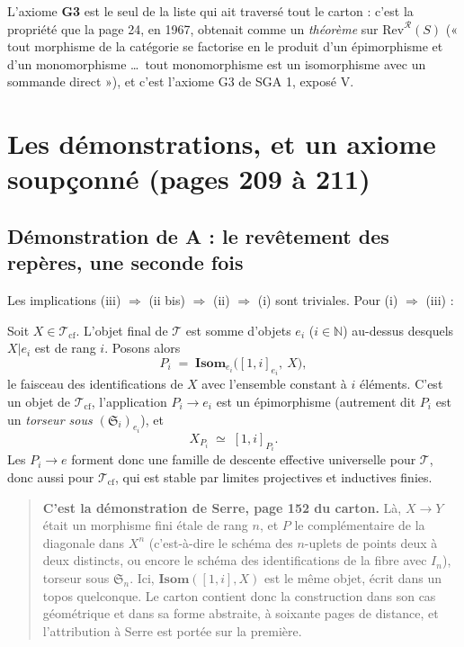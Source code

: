 \documentclass[11pt,a4paper]{article}
\begin{document}
L'axiome \textbf{G3} est le seul de la liste qui ait traversé tout le carton :
c'est la propriété que la page 24, en 1967, obtenait comme un \emph{théorème}
sur $\mathrm{Rev}^{\mathcal{R}}(S)$ (« tout morphisme de la catégorie se
factorise en le produit d'un épimorphisme et d'un monomorphisme …\ tout
monomorphisme est un isomorphisme avec un sommande direct »), et c'est
l'axiome G3 de SGA 1, exposé V.

\section*{Les démonstrations, et un axiome soupçonné (pages 209 à 211)}

\subsection*{Démonstration de A : le revêtement des repères, une seconde fois}

Les implications (iii) $\Rightarrow$ (ii bis) $\Rightarrow$ (ii) $\Rightarrow$
(i) sont triviales. Pour (i) $\Rightarrow$ (iii) :

Soit $X \in \mathcal{T}_{\mathrm{cf}}$. L'objet final de $\mathcal{T}$ est somme
d'objets $e_{i}$ ($i \in \mathbb{N}$) au-dessus desquels $X|e_{i}$ est de rang
$i$. Posons alors
\[
  P_{i} \;=\; \mathbf{Isom}_{e_{i}}\bigl([1,i]_{e_{i}},\ X\bigr) ,
\]
le faisceau des identifications de $X$ avec l'ensemble constant à $i$ éléments.
C'est un objet de $\mathcal{T}_{\mathrm{cf}}$, l'application
$P_{i} \to e_{i}$ est un épimorphisme (autrement dit $P_{i}$ est un
\emph{torseur sous $(\mathfrak{S}_{i})_{e_{i}}$}), et
\[
  X_{P_{i}} \;\simeq\; [1, i]_{P_{i}} .
\]
Les $P_{i} \to e$ forment donc une famille de descente effective universelle
pour $\mathcal{T}$, donc aussi pour $\mathcal{T}_{\mathrm{cf}}$, qui est stable
par limites projectives et inductives finies.

\begin{quote}
\textbf{C'est la démonstration de Serre, page 152 du carton.} Là, $X \to Y$
était un morphisme fini étale de rang $n$, et $P$ le complémentaire de la
diagonale dans $X^{n}$ (c'est-à-dire le schéma des $n$-uplets de points deux
à deux distincts, ou encore le schéma des identifications de la fibre avec
$I_{n}$), torseur sous $\mathfrak{S}_{n}$. Ici, $\mathbf{Isom}([1,i], X)$
est le même objet, écrit dans un topos quelconque. Le carton contient donc la
construction dans son cas géométrique et dans sa forme abstraite, à
soixante pages de distance, et l'attribution à Serre est portée sur la
première.
\end{quote}
\end{document}
